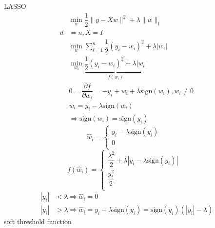 \documentclass{article}
\begin{document}
LASSO
\begin{align*}
&  \displaystyle\min_{w} \dfrac{1}{2} \| y - X w \|^{2} + \lambda \| w \|_{1}
\\ d  &= n, X = I 
\\ &  \displaystyle\min_{w} \displaystyle\sum_{i=1}^{n} \dfrac{1}{2} \left(y_{i} - w_{i}\right)^{2} + \lambda | w_{i} |
\\ &  \displaystyle\min_{w_{i}} \underbrace{\dfrac{1}{2} \left(y_{i} - w_{i}\right)^{2} + \lambda | w_{i} |}_{f\left(w_{i}\right)}
\\ &  0 = \dfrac{\partial f}{\partial w_{i}} = -y_{i} + w_{i} + \lambda \text{sign}\left(w_{i}\right), w_{i} \neq  0
\\ &  w_{i} = y_{i} - \lambda \text{sign}\left(w_{i}\right)
\\ &\Rightarrow  \text{sign}\left(w_{i}\right) = \text{sign}\left(y_{i}\right)
\end{align*}
\[ \hat{w}_{i} =\left\{ \begin{array}{ll}
y_{i} - \lambda \text{sign}\left(y_{i}\right) & \\
0 & \\
\end{array}\right. \]
\[ f\left(\hat{w}_{i}\right) =\left\{ \begin{array}{ll}
\dfrac{\lambda^{2}}{2} + \lambda | y_{i} - \lambda \text{sign}\left(y_{i}\right) | & \\
\dfrac{y_{i}^{2}}{2} & \\
\end{array}\right. \]
\begin{align*}
| y_{i} | &< \lambda \Rightarrow  \hat{w}_{i} = 0
\\ | y_{i} | &> \lambda \Rightarrow  \hat{w}_{i} = y_{i} - \lambda \text{sign}\left(y_{i}\right) = \text{sign}\left(y_{i}\right) \left(| y_{i} | - \lambda\right)
\end{align*}
soft threshold function
\end{document}
